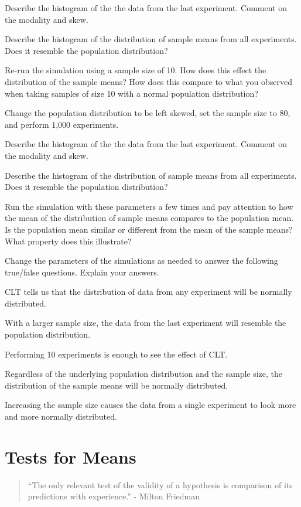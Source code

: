 \documentclass[
]{book}
\theoremstyle{definition}
\theoremstyle{definition}
\theoremstyle{definition}
\theoremstyle{remark}
\begin{document}
Describe the histogram of the the data from the last experiment. Comment on the modality and skew.

Describe the histogram of the distribution of sample means from all experiments. Does it resemble the population distribution?

Re-run the simulation using a sample size of 10. How does this effect the distribution of the sample means? How does this compare to what you observed when taking samples of size 10 with a normal population distribution?

Change the population distribution to be left skewed, set the sample size to 80, and perform 1,000 experiments.

Describe the histogram of the the data from the last experiment. Comment on the modality and skew.

Describe the histogram of the distribution of sample means from all experiments. Does it resemble the population distribution?

Run the simulation with these parameters a few times and pay attention to how the mean of the distribution of sample means compares to the population mean. Is the population mean similar or different from the mean of the sample means? What property does this illustrate?

Change the parameters of the simulations as needed to answer the following true/false questions. Explain your answers.

CLT tells us that the distribution of data from any experiment will be normally distributed.

With a larger sample size, the data from the last experiment will resemble the population distribution.

Performing 10 experiments is enough to see the effect of CLT.

Regardless of the underlying population distribution and the sample size, the distribution of the sample means will be normally distributed.

Increasing the sample size causes the data from a single experiment to look more and more normally distributed.

\hypertarget{ch8}{%
\chapter{Tests for Means}\label{ch8}}

\begin{quote}
``The only relevant test of the validity of a hypothesis is comparison of its predictions with experience.'' - Milton Friedman
\end{quote}
\end{document}
